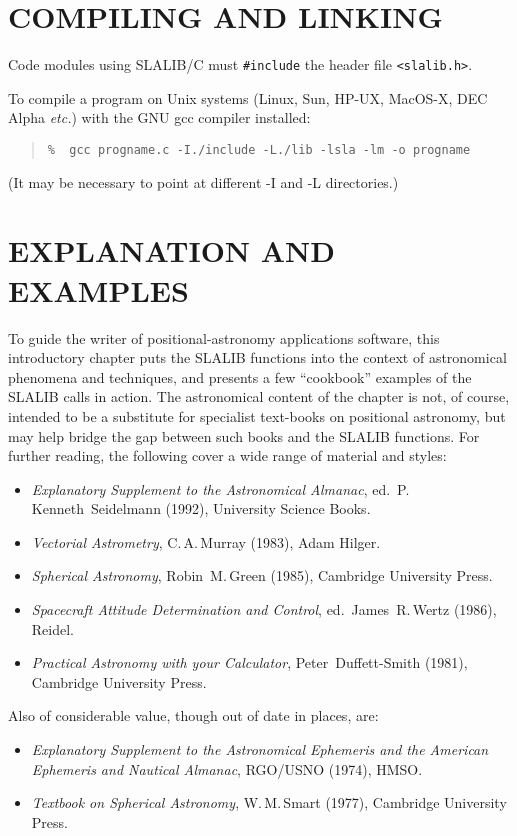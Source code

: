 \documentclass[11pt,fleqn,twoside]{article}
\renewcommand{\_}{{\tt\char'137}}     %
\begin{document}
\section{COMPILING AND LINKING}
 
Code modules using SLALIB/C must {\tt \#include} the header file
{\tt <slalib.h>}.
 
To compile a program on Unix systems
(Linux, Sun, HP-UX, MacOS-X, DEC Alpha {\it etc.})
with the GNU gcc compiler installed:
\begin{verse}
{\tt \%~~gcc progname.c -I./include -L./lib -lsla -lm -o progname}
\end{verse}
(It may be necessary to point at different -I and -L
directories.)

\vfill

\pagebreak

\section{EXPLANATION AND EXAMPLES}
To guide the writer of positional-astronomy applications software,
this introductory chapter puts the SLALIB functions into the context of
astronomical phenomena and techniques, and presents a few
``cookbook'' examples
of the SLALIB calls in action.  The astronomical content of the chapter
is not, of course, intended to be a substitute for specialist text-books on
positional astronomy, but may help bridge the gap between
such books and the SLALIB functions.  For further reading, the following
cover a wide range of material and styles:
\begin{itemize}
\item {\it Explanatory Supplement to the Astronomical Almanac},
      ed.\ P.\,Kenneth~Seidelmann (1992), University Science Books.
\item {\it Vectorial Astrometry}, C.\,A.\,Murray (1983), Adam Hilger.
\item {\it Spherical Astronomy}, Robin~M.\,Green (1985), Cambridge
      University Press.
\item {\it Spacecraft Attitude Determination and Control},
      ed.\ James~R.\,Wertz (1986), Reidel.
\item {\it Practical Astronomy with your Calculator},
      Peter~Duffett-Smith (1981), Cambridge University Press.
\end{itemize}
Also of considerable value, though out of date in places, are:
\begin{itemize}
\item {\it Explanatory Supplement to the Astronomical Ephemeris
      and the American Ephemeris and Nautical Almanac}, RGO/USNO (1974),
      HMSO.
\item {\it Textbook on Spherical Astronomy}, W.\,M.\,Smart (1977),
      Cambridge University Press.
\end{itemize}
\end{document}
